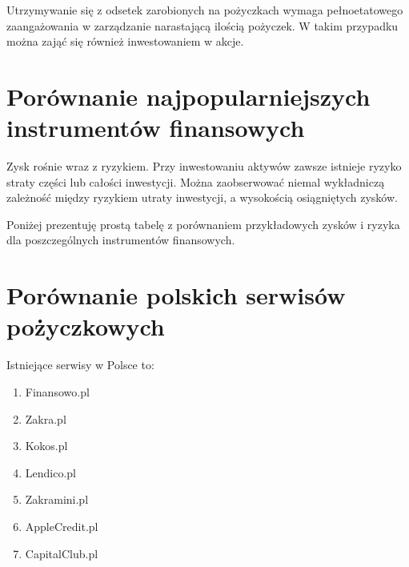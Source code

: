 \documentclass[a4paper,twoside,titlepage,openright]{book}
\begin{document}
Utrzymywanie się z odsetek zarobionych na pożyczkach wymaga pełnoetatowego zaangażowania w zarządzanie narastającą ilością pożyczek. W takim przypadku można zająć się również inwestowaniem w akcje.


\section{Porównanie najpopularniejszych instrumentów finansowych}


Zysk rośnie wraz z ryzykiem. Przy inwestowaniu aktywów zawsze istnieje ryzyko straty części lub całości inwestycji. Można zaobserwować niemal wykładniczą zależność między ryzykiem utraty inwestycji, a wysokością osiągniętych zysków. 

Poniżej prezentuję prostą tabelę z porównaniem przykładowych zysków i ryzyka dla poszczególnych instrumentów finansowych. 

\begin{small}
\noindent
{}
\end{small}


\section{Porównanie polskich serwisów pożyczkowych}

Istniejące serwisy w Polsce to:

\begin{enumerate}

	\item Finansowo.pl \cite{finansowoPl}
	\item Zakra.pl \cite{zakraPl}
	\item Kokos.pl \cite{kokosPl}
	\item Lendico.pl \cite{lendicoPl}
	\item Zakramini.pl \cite{zakraminiPl}
	\item AppleCredit.pl \cite{applecreditPl}
	\item CapitalClub.pl \cite{capitalclubPl}

\end{enumerate}
\end{document}
